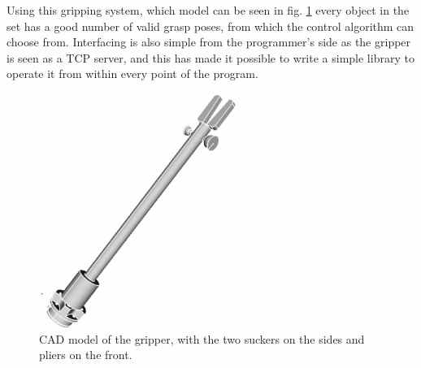Using this gripping system, which model can be seen in fig. \ref{fig:gripper}
every object in the set has a good number of valid grasp poses, from which the
control algorithm can choose from. Interfacing is also simple from the
programmer's side as the gripper is seen as a TCP server, and this has made it
possible to write a simple library to operate it from within every point of the
program.

\begin{figure}[htbp]
  \centering
  \includegraphics[height=3in]{./Graphics/gripper}
  \caption{CAD model of the gripper, with the two suckers on the sides and
  pliers on the front. \label{fig:gripper}}
\end{figure}

